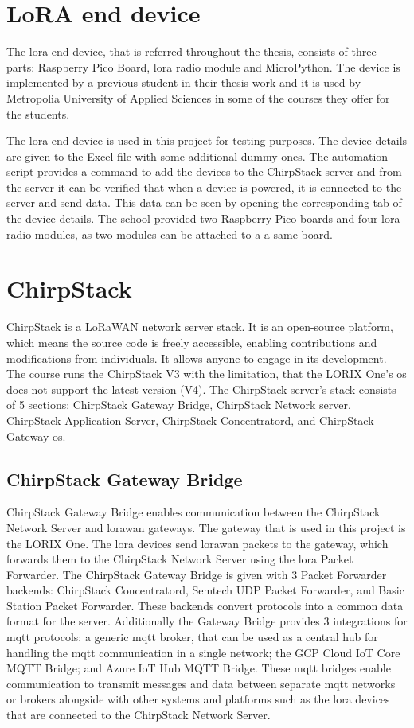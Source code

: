 \section{LoRA end device}
The \gls{lora} end device, that is referred throughout the thesis,  consists of three parts: Raspberry Pico Board, \gls{lora} radio module and MicroPython.
The device is implemented by a previous student in their thesis work\cite{theseus:gere-zoltan} and it is used by Metropolia University of Applied Sciences in some of the courses they offer for the students.


The \gls{lora} end device is used in this project for testing purposes.
The device details are given to the Excel file with some additional dummy ones.
The automation script provides a command to add the devices to the ChirpStack server and from the server it can be verified that when a device is powered, it is connected to the server and send data.
This data can be seen by opening the corresponding tab of the device details.
The school provided two Raspberry Pico boards and four \gls{lora} radio modules, as two modules can be attached to a a same board.


\section{ChirpStack}
ChirpStack is a LoRaWAN network server stack.
It is an open-source platform, which means the source code is freely accessible, enabling contributions and modifications from individuals. It allows anyone to engage in its development.
The course runs the ChirpStack V3 with the limitation, that the LORIX One's \gls{os} does not support the latest version (V4).
The ChirpStack server's stack consists of 5 sections: ChirpStack Gateway Bridge, ChirpStack Network server, ChirpStack Application Server, ChirpStack Concentratord, and ChirpStack Gateway \gls{os}.

\subsection{ChirpStack Gateway Bridge}
ChirpStack Gateway Bridge enables communication between the ChirpStack Network Server and \gls{lorawan} gateways.
The gateway that is used in this project is the LORIX One.
The \gls{lora} devices send \gls{lorawan} packets to the gateway, which forwards them to the ChirpStack Network Server using the \gls{lora} Packet Forwarder.
The ChirpStack Gateway Bridge is given with 3 Packet Forwarder backends: ChirpStack Concentratord, Semtech UDP Packet Forwarder, and Basic Station Packet Forwarder.
These backends convert protocols into a common data format for the server.
Additionally the Gateway Bridge provides 3 integrations for \gls{mqtt} protocols: a generic \gls{mqtt} broker, that can be used as a central hub for handling the \gls{mqtt} communication in a single network; the GCP Cloud IoT Core MQTT Bridge; and Azure IoT Hub MQTT Bridge.
These \gls{mqtt} bridges enable communication to transmit messages and data between separate \gls{mqtt} networks or brokers alongside with other systems and platforms such as the \gls{lora} devices that are connected to the ChirpStack Network Server.
\cite{chirpstack:gatewayBridge}

